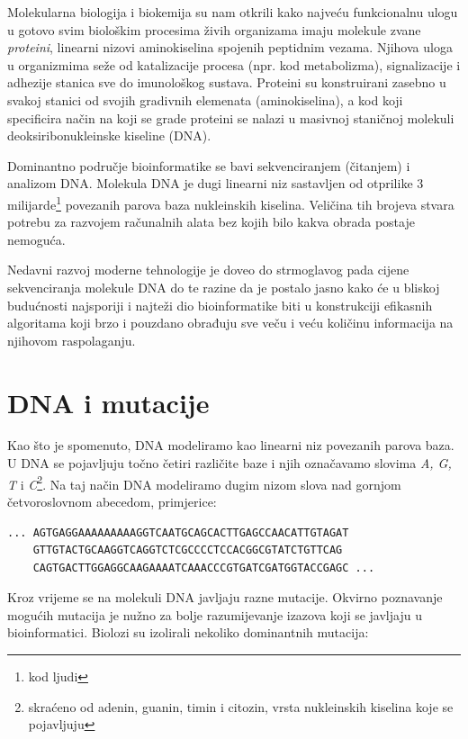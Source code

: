 \documentclass[times, utf8, diplomski]{fer}
\begin{document}
Molekularna biologija i biokemija su nam otkrili kako najveću funkcionalnu ulogu u gotovo svim biološkim procesima
živih organizama imaju molekule zvane \emph{proteini}, linearni nizovi aminokiselina spojenih peptidnim vezama.
Njihova uloga u organizmima seže od katalizacije procesa (npr. kod metabolizma), signalizacije i adhezije stanica
sve do imunološkog sustava. Proteini su konstruirani zasebno u svakoj stanici od svojih gradivnih elemenata (aminokiselina),
a kod koji specificira način na koji se grade proteini se nalazi u masivnoj staničnoj molekuli
deoksiribonukleinske kiseline (DNA).

Dominantno područje bioinformatike se bavi sekvenciranjem (čitanjem) i analizom DNA. Molekula DNA je dugi linearni niz sastavljen od otprilike
3 milijarde\footnote{kod ljudi} povezanih parova baza nukleinskih kiselina. Veličina tih brojeva stvara potrebu za razvojem računalnih alata
bez kojih bilo kakva obrada postaje nemoguća.

Nedavni razvoj moderne tehnologije je doveo do strmoglavog pada cijene sekvenciranja molekule DNA do te razine da je
postalo jasno kako će u bliskoj budućnosti najsporiji i najteži dio bioinformatike biti u konstrukciji efikasnih
algoritama koji brzo i pouzdano obrađuju sve veču i veću količinu informacija na njihovom raspolaganju.

\section{DNA i mutacije}
Kao što je spomenuto, DNA modeliramo kao linearni niz povezanih parova baza. U DNA se pojavljuju točno četiri različite baze i njih
označavamo slovima \emph{A, G, T} i \emph{C}\footnote{skraćeno od adenin, guanin, timin i citozin, vrsta nukleinskih kiselina koje se pojavljuju}.
Na taj način DNA modeliramo dugim nizom slova nad gornjom četvoroslovnom abecedom, primjerice:

\begin{verbatim}
... AGTGAGGAAAAAAAAAGGTCAATGCAGCACTTGAGCCAACATTGTAGAT
    GTTGTACTGCAAGGTCAGGTCTCGCCCCTCCACGGCGTATCTGTTCAG
    CAGTGACTTGGAGGCAAGAAAATCAAACCCGTGATCGATGGTACCGAGC ...
\end{verbatim}

Kroz vrijeme se na molekuli DNA javljaju razne mutacije. Okvirno poznavanje mogućih mutacija je nužno za bolje razumijevanje izazova koji se javljaju u bioinformatici. Biolozi su izolirali nekoliko dominantnih mutacija:
\end{document}
